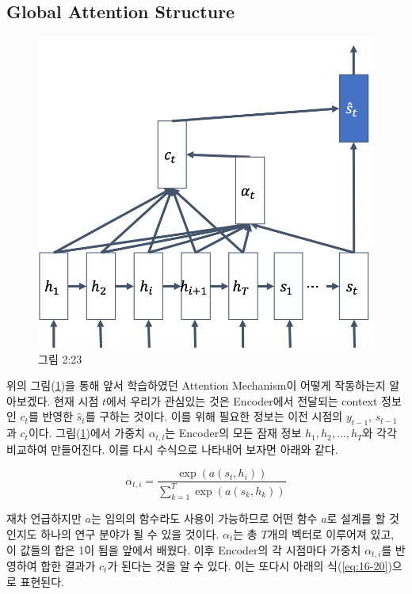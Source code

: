 \documentclass[draft=false]{oblivoir}
\begin{document}
\subsection{Global Attention Structure}

\begin{figure}[ht] \centering 
  \includegraphics[scale=0.5]{fig21.png} 
  \caption{그림 2:23}
  \label{fig:16-21}
\end{figure}

위의 그림(\ref{fig:16-21})을 통해 앞서 학습하였던 Attention Mechanism이 어떻게 작동하는지 알아보겠다. 현재 시점 $t$에서 우리가 관심있는 것은 Encoder에서 전달되는 context 정보인 $c_t$를 반영한 $\hat{s}_t$를 구하는 것이다. 이를 위해 필요한 정보는 이전 시점의 $y_{t-1}$, $s_{t-1}$과 $c_{t}$이다. 그림(\ref{fig:16-21})에서 가중치 $\alpha_{t,l}$는 Encoder의 모든 잠재 정보 $h_1, h_2, ..., h_T$와 각각 비교하여 만들어진다. 이를 다시 수식으로 나타내어 보자면 아래와 같다. 

\begin{equation}
	\alpha_{t,i} = \frac{\exp{(a(s_t, h_i))}}{\sum_{k=1}^{T}\exp{(a(s_k, h_k))}}
	\label{eq:16-19}
\end{equation}

재차 언급하지만 $a$는 임의의 함수라도 사용이 가능하므로 어떤 함수 $a$로 설계를 할 것인지도 하나의 연구 분야가 될 수 있을 것이다. $\alpha_{t}$는 총 $T$개의 벡터로 이루어져 있고, 이 값들의 합은 1이 됨을 앞에서 배웠다. 이후 Encoder의 각 시점마다 가중치 $\alpha_{t,i}$를 반영하여 합한 결과가 $c_t$가 된다는 것을 알 수 있다. 이는 또다시 아래의 식(\ref{eq:16-20})으로 표현된다.
\end{document}
